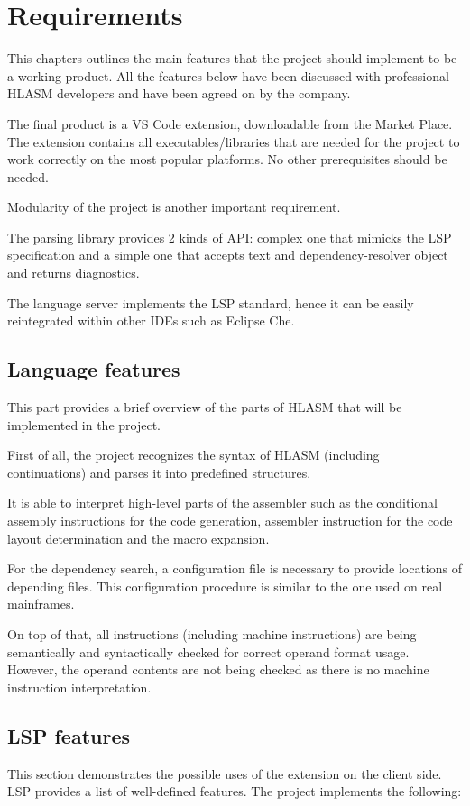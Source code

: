 \chapter{Requirements}

This chapters outlines the main features that the project should implement to be a working product. All the features below have been discussed with professional HLASM developers and have been agreed on by the company.

The final product is a VS Code extension, downloadable from the Market Place. The extension contains all executables/libraries that are needed for the project to work correctly on the most popular platforms. No other prerequisites should be needed.

Modularity of the project is another important requirement. 

The parsing library provides 2 kinds of API: complex one that mimicks the LSP specification and a simple one that accepts text and dependency-resolver object and returns diagnostics. 

The language server implements the LSP standard, hence it can be easily reintegrated within other IDEs such as Eclipse Che.

\section{Language features}
This part provides a brief overview of the parts of HLASM that will be implemented in  the project.

First of all, the project recognizes the syntax of HLASM (including continuations) and parses it into predefined structures. 

It is able to interpret high-level parts of the assembler such as the conditional assembly instructions for the code generation, assembler instruction for the code layout determination and the macro expansion.

For the dependency search, a configuration file is necessary to provide locations of depending files. This configuration procedure is similar to the one used on real mainframes.

On top of that, all instructions (including machine instructions) are being semantically and syntactically checked for correct operand format usage. However, the operand contents are not being checked as there is no machine instruction interpretation.

\section{LSP features}
This section demonstrates the possible uses of the extension on the client side. LSP provides a list of well-defined features. The project implements the following:

